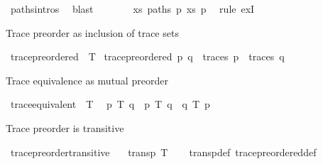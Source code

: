 \begin{isabellebody}
\ paths{\isachardot}{\kern0pt}intros{\isacharparenleft}{\kern0pt}{}{\isacharparenright}{\kern0pt}\ \isamarkupfalse%
\ blast\isanewline
\ \ \ \ \isamarkupfalse%
\ \isamarkupfalse%
\ {\isachardoublequoteopen}{\isasymexists}xs{\isachardot}{\kern0pt}\ paths\ p\ xs\ p{\isacharprime}{\kern0pt}{\isacharprime}{\kern0pt}{\isachardoublequoteclose}\ \isamarkupfalse%
\ {\isacharparenleft}{\kern0pt}rule\ exI{\isacharparenright}{\kern0pt}\isanewline
\ \ \isamarkupfalse%
\isanewline
{}\isamarkupfalse%
%
\endisatagproof
{\isafoldproof}%
%
\isadelimproof
%
\endisadelimproof
%
\begin{isamarkuptext}%
Trace preorder as inclusion of trace sets%
\end{isamarkuptext}\isamarkuptrue%
\isamarkupfalse%
\ trace{\isacharunderscore}{\kern0pt}preordered\ {\isacharparenleft}{\kern0pt}\ {\isacartoucheopen}{\isasymlesssim}T{\isacartoucheclose}\ {}{}{\isacharparenright}{\kern0pt}\isanewline
{\isacartoucheopen}trace{\isacharunderscore}{\kern0pt}preordered\ p\ q\ {\isasymequiv}\ traces\ p\ {\isasymsubseteq}\ traces\ q{\isacartoucheclose}%
\begin{isamarkuptext}%
Trace equivalence as mutual preorder%
\end{isamarkuptext}\isamarkuptrue%
\isamarkupfalse%
\ trace{\isacharunderscore}{\kern0pt}equivalent\ {\isacharparenleft}{\kern0pt}\ {\isacartoucheopen}{\isasymsimeq}T{\isacartoucheclose}\ {}{}{\isacharparenright}{\kern0pt}\ \isanewline
{\isacartoucheopen}p\ {\isasymsimeq}T\ q\ {\isasymequiv}\ p\ {\isasymlesssim}T\ q\ {\isasymand}\ q\ {\isasymlesssim}T\ p{\isacartoucheclose}%
\begin{isamarkuptext}%
Trace preorder is transitive%
\end{isamarkuptext}\isamarkuptrue%
\isamarkupfalse%
\ trace{\isacharunderscore}{\kern0pt}preorder{\isacharunderscore}{\kern0pt}transitive{\isacharcolon}{\kern0pt}\isanewline
\ \ \ {\isacartoucheopen}transp\ {\isacharparenleft}{\kern0pt}{\isasymlesssim}T{\isacharparenright}{\kern0pt}{\isacartoucheclose}\isanewline
%
\isadelimproof
\ \ %
\endisadelimproof
%
\isatagproof
{}\isamarkupfalse%
\ transp{\isacharunderscore}{\kern0pt}def\ trace{\isacharunderscore}{\kern0pt}preordered{\isacharunderscore}{\kern0pt}def\ \isamarkupfalse%

\end{isabellebody}
